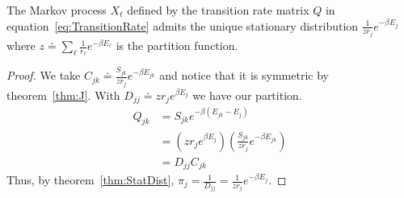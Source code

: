 \begin{mythm}
\label{thm:E}
The Markov process $X_t$ defined by the transition rate matrix $Q$ in equation~\ref{eq:TransitionRate} admits the unique stationary distribution $\frac{1}{zr_j}e^{-\beta E_j}$ where $z \doteq \sum_\ell \frac{1}{r_\ell}e^{-\beta E_\ell}$ is the partition function. 
\end{mythm}
\begin{proof}
We take $C_{jk} \doteq \frac{S_{jk}}{zr_j}e^{-\beta E_{jk}}$ and notice that it is symmetric by theorem~\ref{thm:J}. With $D_{jj} \doteq zr_je^{\beta E_j}$ we have our partition.  
\begin{align}
Q_{jk} &= S_{jk}e^{-\beta\left(E_{jk} - E_j\right)} \\
       &= \left(zr_je^{\beta E_j}\right) \left(\frac{S_{jk}}{zr_j}e^{-\beta E_{jk}}\right) \\
       &= D_{jj}C_{jk}   
\end{align}
Thus, by theorem~\ref{thm:StatDist},  $\pi_j = \frac{1}{D_{jj}} = \frac{1}{zr_j}e^{-\beta E_j}$.
\end{proof}

